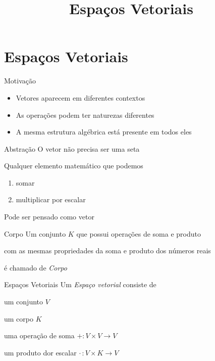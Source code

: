 \documentclass[fleqn,aspectratio=169,12pt]{beamer}
\title{Espaços Vetoriais}
\begin{document}
\addtitle

\section{Espaços Vetoriais}

\begin{frame}{Motivação}
  \begin{itemize}[<+->]
    \setlength{\itemsep}{1em}
    \item Vetores aparecem em diferentes contextos
    \item As operações podem ter naturezas diferentes
    \item A mesma estrutura algébrica está presente em todos eles
  \end{itemize}
\end{frame}

\begin{frame}{Abstração}
  O vetor não precisa ser uma seta

  \pause
  Qualquer elemento matemático que podemos
  \pause
  \begin{enumerate}
    \item somar
    \pause
    \item multiplicar por escalar
  \end{enumerate}
  \pause
  Pode ser pensado como vetor
\end{frame}

\begin{frame}{Corpo}
  Um conjunto $K$ que possui operações de soma e produto

  \pause
  \medskip
  com as mesmas propriedades da soma e produto dos números reais

  \pause
  \medskip
  é chamado de \emph{Corpo}
\end{frame}

\begin{frame}{Espaços Vetoriais}
  Um \emph{Espaço vetorial} consiste de

  \pause
  \quad um conjunto \quad $V$

  \pause
  \quad um corpo \quad\quad $K$

  \pause
  \quad uma operação de soma \quad \(+\colon V\times V \to V\)

  \pause
  \quad um produto dor escalar \quad \(\cdot\,\colon V\times K \to V\)
\end{frame}
\end{document}
